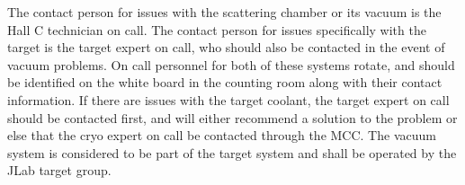 {\begin{safetyen}{0}{0}
The contact person for issues with the scattering chamber or its
vacuum is the Hall C technician on call. The contact person for issues
specifically with the target is the target expert on call, who should
also be contacted in the event of vacuum problems.  On call personnel
for both of these systems rotate, and should be identified on the
white board in the counting room along with their contact information.
If there are issues with the target coolant, the target expert on call
should be contacted first, and will either recommend a solution to the
problem or else that the cryo expert on call be contacted through the
MCC. The vacuum system is considered to be part of the target system
and shall be operated by the JLab target group.
\end{safetyen}
}
%
